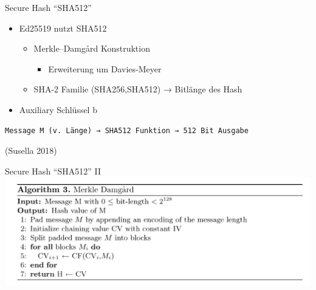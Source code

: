 \documentclass[
  9pt,
  ignorenonframetext,
  aspectratio=169,
]{beamer}
\providecommand{\tightlist}{%
  \setlength{\itemsep}{0pt}\setlength{\parskip}{0pt}}
\begin{document}
\begin{frame}[fragile]{Secure Hash ``SHA512''}
\protect\hypertarget{secure-hash-sha512}{}
\begin{itemize}
\tightlist
\item
  Ed25519 nutzt SHA512

  \begin{itemize}
  \tightlist
  \item
    Merkle--Damgård Konstruktion

    \begin{itemize}
    \tightlist
    \item
      Erweiterung um Davies-Meyer
    \end{itemize}
  \item
    SHA-2 Familie (SHA256,SHA512) → Bitlänge des Hash
  \end{itemize}
\item
  Auxiliary Schlüssel b
\end{itemize}

\begin{verbatim}
Message M (v. Länge) → SHA512 Funktion → 512 Bit Ausgabe
\end{verbatim}

(Susella 2018)
\end{frame}

\begin{frame}{Secure Hash ``SHA512'' II}
\protect\hypertarget{secure-hash-sha512-ii}{}
\includegraphics{Abbildungen/MD.png}
\end{frame}
\end{document}
